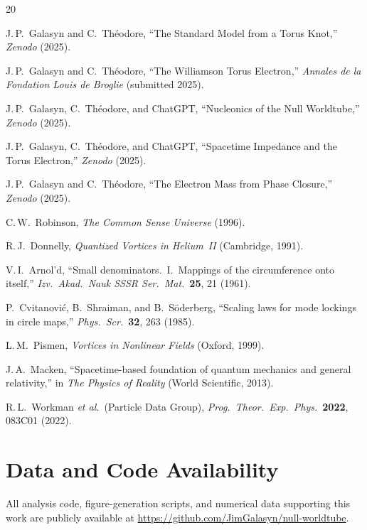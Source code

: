 \documentclass[11pt,a4paper]{article}
\begin{document}
\begin{thebibliography}{20}

J.\,P.~Galasyn and C.~Th\'eodore,
``The Standard Model from a Torus Knot,''
\emph{Zenodo} (2025).

J.\,P.~Galasyn and C.~Th\'eodore,
``The Williamson Torus Electron,''
\emph{Annales de la Fondation Louis de Broglie} (submitted 2025).

J.\,P.~Galasyn, C.~Th\'eodore, and ChatGPT,
``Nucleonics of the Null Worldtube,''
\emph{Zenodo} (2025).

J.\,P.~Galasyn, C.~Th\'eodore, and ChatGPT,
``Spacetime Impedance and the Torus Electron,''
\emph{Zenodo} (2025).

J.\,P.~Galasyn and C.~Th\'eodore,
``The Electron Mass from Phase Closure,''
\emph{Zenodo} (2025).

C.\,W.~Robinson,
\emph{The Common Sense Universe} (1996).

R.\,J.~Donnelly,
\emph{Quantized Vortices in Helium~II} (Cambridge, 1991).

V.\,I.~Arnol'd,
``Small denominators.\ I.\ Mappings of the circumference onto
itself,''
\emph{Izv.\ Akad.\ Nauk SSSR Ser.\ Mat.}\ \textbf{25}, 21 (1961).

P.~Cvitanovi\'c, B.~Shraiman, and B.~S\"oderberg,
``Scaling laws for mode lockings in circle maps,''
\emph{Phys.\ Scr.}\ \textbf{32}, 263 (1985).

L.\,M.~Pismen,
\emph{Vortices in Nonlinear Fields} (Oxford, 1999).

J.\,A.~Macken,
``Spacetime-based foundation of quantum mechanics and general
relativity,''
in \emph{The Physics of Reality} (World Scientific, 2013).

R.\,L.~Workman \emph{et al.}\ (Particle Data Group),
\emph{Prog.\ Theor.\ Exp.\ Phys.}\ \textbf{2022}, 083C01 (2022).

\end{thebibliography}

\section*{Data and Code Availability}

All analysis code, figure-generation scripts, and numerical data
supporting this work are publicly available at
\url{https://github.com/JimGalasyn/null-worldtube}.
\end{document}
